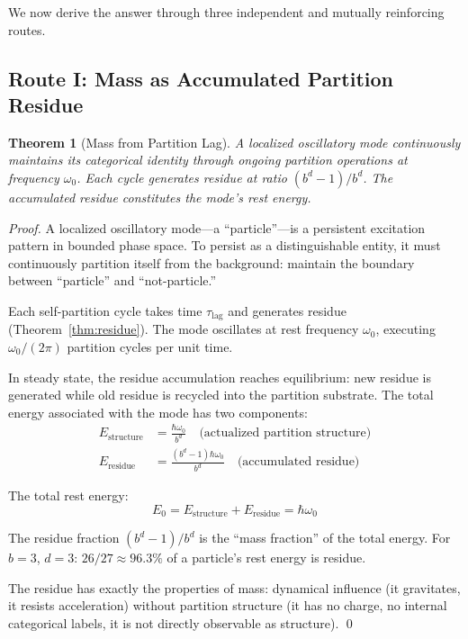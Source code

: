 \documentclass[twocolumn,10pt,a4paper]{article}
\newtheorem{theorem}{Theorem}[section]
\theoremstyle{definition}
\theoremstyle{remark}
\newcommand{\Lag}{\tau_{\mathrm{lag}}}
\begin{document}
We now derive the answer through three independent and mutually reinforcing routes.

\subsection{Route I: Mass as Accumulated Partition Residue}

\begin{theorem}[Mass from Partition Lag]
\label{thm:mass-residue}
A localized oscillatory mode continuously maintains its categorical identity through ongoing partition operations at frequency $\omega_0$. Each cycle generates residue at ratio $(b^d - 1)/b^d$. The accumulated residue constitutes the mode's rest energy.
\end{theorem}

\begin{proof}
A localized oscillatory mode---a ``particle''---is a persistent excitation pattern in bounded phase space. To persist as a distinguishable entity, it must continuously partition itself from the background: maintain the boundary between ``particle'' and ``not-particle.''

Each self-partition cycle takes time $\Lag$ and generates residue (Theorem~\ref{thm:residue}). The mode oscillates at rest frequency $\omega_0$, executing $\omega_0/(2\pi)$ partition cycles per unit time.

In steady state, the residue accumulation reaches equilibrium: new residue is generated while old residue is recycled into the partition substrate. The total energy associated with the mode has two components:
\begin{align}
    E_{\text{structure}} &= \frac{\hbar\omega_0}{b^d} \quad \text{(actualized partition structure)} \\
    E_{\text{residue}} &= \frac{(b^d - 1)\hbar\omega_0}{b^d} \quad \text{(accumulated residue)}
\end{align}

The total rest energy:
\begin{equation}
    E_0 = E_{\text{structure}} + E_{\text{residue}} = \hbar\omega_0
\end{equation}

The residue fraction $(b^d - 1)/b^d$ is the ``mass fraction'' of the total energy. For $b = 3$, $d = 3$: $26/27 \approx 96.3\%$ of a particle's rest energy is residue.

The residue has exactly the properties of mass: dynamical influence (it gravitates, it resists acceleration) without partition structure (it has no charge, no internal categorical labels, it is not directly observable as structure). \qed
\end{proof}
\end{document}

